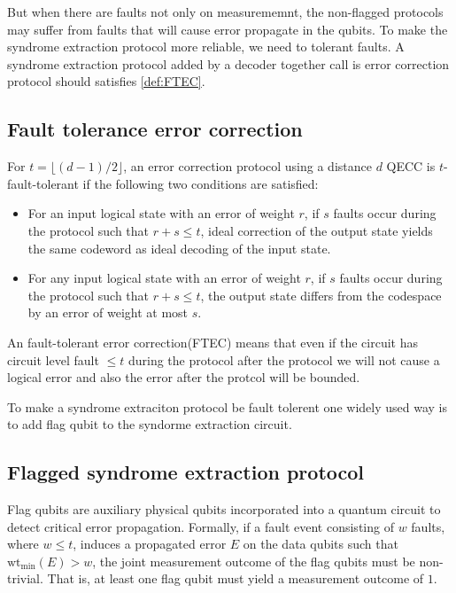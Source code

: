\documentclass[acmsmallw,review]{acmart}
\begin{document}
But when there are faults not only on measurememnt, the non-flagged protocols may suffer from faults that will cause error propagate in the qubits. 
To make the syndrome extraction protocol more reliable, we need to tolerant faults. A syndrome extraction protocol added by a decoder together call is error correction protocol should satisfies \ref{def:FTEC}.

\subsection{Fault tolerance error correction}
\begin{definition}
\label{def:FTEC}
For $t = \lfloor (d-1)/2 \rfloor$, an error correction protocol using a distance $d$ QECC is $t$-fault-tolerant if the following two conditions are satisfied:
\begin{itemize}
    \item For an input logical state with an error of weight $r$, if $s$  faults occur during the protocol such that $r + s \leq t$, ideal correction of the output state yields the same codeword as ideal decoding of the input state.
    \item For any input logical state with an error of weight $r$, if $s$ faults occur during the protocol such that $r + s \leq t$, the output state differs from the codespace by an error of weight at most $s$.
\end{itemize}
\end{definition}

An fault-tolerant error correction(FTEC) means that even if the circuit has circuit level fault $\leq t $ during the protocol after the protocol we will not cause a logical error and also the error after the protcol will be bounded.

To make a syndrome extraciton protocol be fault tolerent one widely used way is to add flag qubit to the syndorme extraction circuit.

\subsection{Flagged syndrome extraction protocol}
\label{sec:flagged-syndrome-extraction-protcol}
\begin{definition}
\label{def:flag-qubit}
    Flag qubits are auxiliary physical qubits incorporated into a quantum circuit to detect critical error propagation. Formally, if a fault event consisting of $w$ faults, where $w \leq t$, induces a propagated error $E$ on the data qubits such that $\mathrm{wt}_{\min}(E) > w$, the joint measurement outcome of the flag qubits must be non-trivial. That is, at least one flag qubit must yield a measurement outcome of $1$.
\end{definition}
\end{document}
